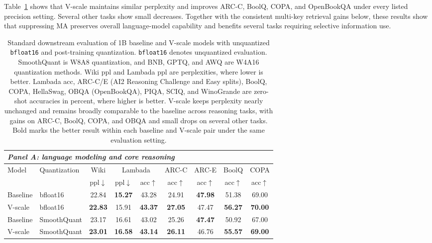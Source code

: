 \documentclass{article}
\theoremstyle{plain}
\theoremstyle{definition}
\theoremstyle{remark}
\begin{document}
Table~\ref{tab:additional_downstream_1b} shows that V-scale maintains similar perplexity and improves ARC-C, BoolQ, COPA, and OpenBookQA under every listed precision setting. Several other tasks show small decreases. Together with the consistent multi-key retrieval gains below, these results show that suppressing MA preserves overall language-model capability and benefits several tasks requiring selective information use.

\begin{table}[ht]
    \centering
    \caption{
    Standard downstream evaluation of 1B baseline and V-scale models with unquantized \texttt{bfloat16} and post-training quantization.
    \texttt{bfloat16} denotes unquantized evaluation. SmoothQuant is W8A8 quantization, and BNB, GPTQ, and AWQ are W4A16 quantization methods.
    Wiki ppl and Lambada ppl are perplexities, where lower is better.
    Lambada acc, ARC-C/E (AI2 Reasoning Challenge and Easy splits), BoolQ, COPA, HellaSwag, OBQA (OpenBookQA), PIQA, SCIQ, and WinoGrande are zero-shot accuracies in percent, where higher is better.
    V-scale keeps perplexity nearly unchanged and remains broadly comparable to the baseline across reasoning tasks, with gains on ARC-C, BoolQ, COPA, and OBQA and small drops on several other tasks.
    Bold marks the better result within each baseline and V-scale pair under the same evaluation setting.
    }\label{tab:additional_downstream_1b}
    \setlength\tabcolsep{3pt}
    \begin{tabular}{llccccccc}
        \toprule
        \multicolumn{9}{l}{\emph{Panel A: language modeling and core reasoning}} \\
        \midrule
        \multirow{2}{*}{Model} & \multirow{2}{*}{Quantization} & Wiki & \multicolumn{2}{c}{Lambada} & ARC-C & ARC-E & BoolQ & COPA \\
        & & ppl$\downarrow$ & ppl$\downarrow$ & acc$\uparrow$ & acc$\uparrow$ & acc$\uparrow$ & acc$\uparrow$ & acc$\uparrow$ \\
        \midrule
        Baseline & bfloat16 & 22.84 & \textbf{15.27} & 43.28 & 24.91 & \textbf{47.98} & 51.38 & 69.00 \\
        V-scale & bfloat16 & \textbf{22.83} & 15.91 & \textbf{43.37} & \textbf{27.05} & 47.47 & \textbf{56.27} & \textbf{70.00} \\
        Baseline & SmoothQuant & 23.17 & 16.61 & 43.02 & 25.26 & \textbf{47.47} & 50.92 & 67.00 \\
        V-scale & SmoothQuant & \textbf{23.01} & \textbf{16.58} & \textbf{43.14} & \textbf{26.11} & 46.76 & \textbf{55.57} & \textbf{69.00} \\

\end{tabular}
\end{table}
\end{document}
